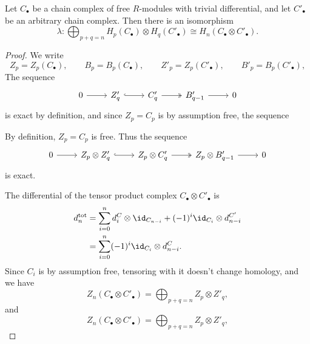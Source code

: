\documentclass[main.tex]{subfiles}
\begin{document}
\begin{lemma}
  \label{lemma:stepping_stone_to_kunneth}
  Let $C_{\bullet}$ be a chain complex of free $R$-modules with trivial differential, and let $C'_{\bullet}$ be an arbitrary chain complex. Then there is an isomorphism
  \begin{equation*}
    \lambda\colon \bigoplus_{p + q = n} H_{p}(C_{\bullet}) \otimes H_{q}(C'_{\bullet}) \cong H_{n}(C_{\bullet} \otimes C'_{\bullet}).
  \end{equation*}
\end{lemma}
\begin{proof}
  We write
  \begin{equation*}
    Z_{p} = Z_{p}(C_{\bullet}),\qquad B_{p} = B_{p}(C_{\bullet}),\qquad Z'_{p} = Z_{p}(C'_{\bullet}),\qquad B'_{p} = B_{p}(C'_{\bullet}),
  \end{equation*}
  The sequence
  \begin{equation*}
    \begin{tikzcd}
      0
      \arrow[r]
      & Z_{q}'
      \arrow[r, hook]
      & C_{q}'
      \arrow[r, two heads]
      & B_{q-1}'
      \arrow[r]
      & 0
    \end{tikzcd}
  \end{equation*}
  is exact by definition, and since $Z_{p} = C_{p}$ is by assumption free, the sequence

  By definition, $Z_{p} = C_{p}$ is free. Thus the sequence
  \begin{equation*}
    \begin{tikzcd}
      0
      \arrow[r]
      & Z_{p} \otimes Z_{q}'
      \arrow[r, hook]
      & Z_{p} \otimes C_{q}'
      \arrow[r, two heads]
      & Z_{p} \otimes B_{q-1}'
      \arrow[r]
      & 0
    \end{tikzcd}
  \end{equation*}
  is exact.

  The differential of the tensor product complex $C_{\bullet} \otimes C'_{\bullet}$ is
  \begin{align*}
    d^{\mathrm{tot}}_{n} &= \sum_{i = 0}^{n} d^{C}_{i} \otimes \id_{C_{n-i}} + (-1)^{i} \id_{C_{i}} \otimes d^{C'}_{n-i} \\
    &= \sum_{i = 0}^{n} (-1)^{i}\id_{C_{i}} \otimes d^{C}_{n-i}.
  \end{align*}
  Since $C_{i}$ is by assumption free, tensoring with it doesn't change homology, and we have
  \begin{equation*}
    Z_{n}(C_{\bullet} \otimes C'_{\bullet}) = \bigoplus_{p + q = n} Z_{p} \otimes Z'_{q},
  \end{equation*}
  and
  \begin{equation*}
    Z_{n}(C_{\bullet} \otimes C'_{\bullet}) = \bigoplus_{p + q = n} Z_{p} \otimes Z'_{q},
  \end{equation*}

\end{proof}
\end{document}
